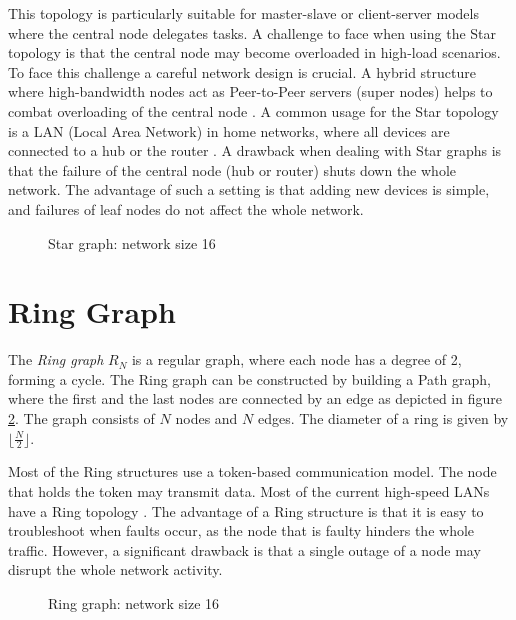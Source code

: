 This topology is particularly suitable for master-slave or client-server models where the central node delegates tasks. A challenge to face when using the Star topology is that the central node may become overloaded in high-load scenarios. To face this challenge a careful network design is crucial. A hybrid structure where high-bandwidth nodes act as Peer-to-Peer servers (super nodes) helps to combat overloading of the central node \cite{Peer2PeerSchindelhaauer2023}. A common usage for the Star topology is a LAN (Local Area Network) in home networks, where all devices are connected to a hub or the router \cite{Jayeola2023}. A drawback when dealing with Star graphs is that the failure of the central node (hub or router) shuts down the whole network. The advantage of such a setting is that adding new devices is simple, and failures of leaf nodes do not affect the whole network.

\begin{figure}[H]
    \centering
    
    \caption{Star graph: network size 16}
    \label{fig:stargraphDemo}
\end{figure}

\section{Ring Graph}\label{sec:2ringgraph}
The \textit{Ring graph} $R_N$ is a regular graph, where each node has a degree of 2, forming a cycle. The Ring graph can be constructed by building a Path graph, where the first and the last nodes are connected by an edge as depicted in figure \ref{fig:ring}. The graph consists of $N$ nodes and $N$ edges. The diameter of a ring is given by $\lfloor{\frac{N}{2}}\rfloor$.

Most of the Ring structures use a token-based communication model. The node that holds the token may transmit data. Most of the current high-speed LANs have a Ring topology \cite{Vidomenko1997}. The advantage of a Ring structure is that it is easy to troubleshoot when faults occur, as the node that is faulty hinders the whole traffic. However, a significant drawback is that a single outage of a node may disrupt the whole network activity.

\begin{figure}[H]
    \centering
    \scalebox{0.8}{}
    \caption{Ring graph: network size 16}
    \label{fig:ring}
\end{figure}

